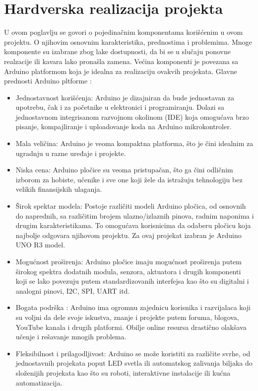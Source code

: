 \documentclass[a4paper, 12pt]{article}
\begin{document}
\pagebreak
\endgroup

\begingroup
\section{Hardverska realizacija projekta}

\vspace{10pt}

U ovom poglavlju se govori o pojedinačnim komponentama korišćenim u ovom projektu. O njihovim osnovnim karakteristika, prednostima i problemima. Mnoge komponente su izabrane zbog lake dostupnosti, da bi se u slučaju ponovne realzacije ili kavara lako pronašla zamena. Većina komponenti je povezana sa Arduino platformom koja je idealna za realizaciju ovakvih projekata. Glavne prednosti Arduino pltforme :

	\begin{itemize}
	
		\item Jednostavnost korišćenja: Arduino je dizajniran da bude jednostavan za upotrebu, čak i za početnike u elektronici i programiranju. Dolazi sa jednostavnom integrisanom razvojnom okolinom (IDE) koja omogućava brzo pisanje, kompajliranje i uploadovanje koda na Arduino mikrokontroler.
		\item Mala veličina: Arduino je veoma kompaktna platforma, što je čini idealnim za ugradnju u razne uređaje i projekte.
        \item Niska cena: Arduino pločice su veoma pristupačan, što ga čini odličnim izborom za hobiste, učenike i sve one koji žele da istražuju tehnologiju bez velikih finansijskih ulaganja.
        \item Širok spektar modela: Postoje različiti modeli Arduino pločica, od osnovnih do naprednih, sa različitim brojem ulazno/izlaznih pinova, radnim naponima i drugim karakteristikama. To omogućava korisnicima da odaberu pločicu koja najbolje odgovara njihovom projektu. Za ovaj projekat izabran je Arduino UNO R3 model.
        \item Mogućnost proširenja: Arduino pločice imaju mogućnost proširenja putem širokog spektra dodatnih modula, senzora, aktuatora i drugih komponenti koji se lako povezuju putem standardizovanih interfejsa kao što su digitalni i analogni pinovi, I2C, SPI, UART itd.
        \item Bogata podrška : Arduino ima ogromnu zajednicu korisnika i razvijalaca koji su voljni da dele svoje iskustva, znanje i projekte putem foruma, blogova, YouTube kanala i drugih platformi. Obilje  online resursa drastično olakšava učenje i rešavanje mnogih problema.
        \item Fleksibilnost i prilagodljivost: Arduino se može koristiti za različite svrhe, od jednostavnih projekata poput LED svetla ili automatskog zalivanja biljaka do složenijih projekata kao što su roboti, interaktivne instalacije ili kućna automatizacija. 
       
	\end{itemize}
\end{document}

